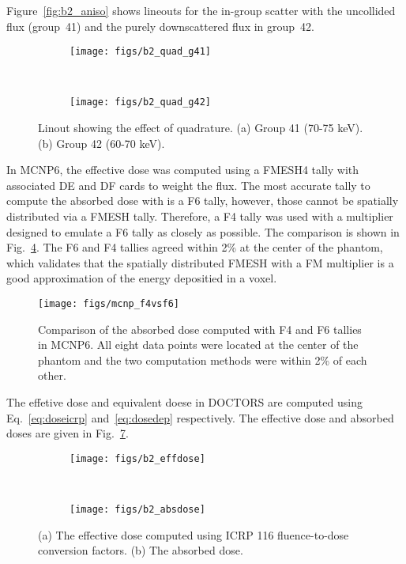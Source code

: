 Figure~\ref{fig:b2_aniso} shows lineouts for the in-group scatter with the uncollided flux (group~41) and the purely downscattered flux in group~42.
\begin{figure}
    \centering
    \begin{subfigure}[b]{0.3\textwidth}
        \texttt{[image: figs/b2\_quad\_g41]}
        \caption{}
        \label{fig:b2_quad_g41}
    \end{subfigure}
    ~ 
    \begin{subfigure}[b]{0.3\textwidth}
        \texttt{[image: figs/b2\_quad\_g42]}
        \caption{}
        \label{fig:b2_quad_g42}
    \end{subfigure}
    \caption{Linout showing the effect of quadrature. (a) Group 41 (70-75 keV). (b) Group 42 (60-70 keV). }\label{fig:b2_quad}
\end{figure}

In MCNP6, the effective dose was computed using a FMESH4 tally with associated DE and DF cards to weight the flux. The most accurate tally to compute the absorbed dose with is a F6 tally, however, those cannot be spatially distributed via a FMESH tally. Therefore, a F4 tally was used with a multiplier designed to emulate a F6 tally as closely as possible. The comparison is shown in Fig.~\ref{fig:mcnp_f4vsf6}. The F6 and F4 tallies agreed within 2\% at the center of the phantom, which validates that the spatially distributed FMESH with a FM multiplier is a good approximation of the energy depositied in a voxel.

\begin{figure}[tb]
  \begin{center}
   \texttt{[image: figs/mcnp\_f4vsf6]}
  \end{center}
  \caption{Comparison of the absorbed dose computed with F4 and F6 tallies in MCNP6. All eight data points were located at the center of the phantom and the two computation methods were within 2\% of each other.}
\label{fig:mcnp_f4vsf6}
\end{figure}

The effetive dose and equivalent doese in DOCTORS are computed using Eq.~\ref{eq:doseicrp} and~\ref{eq:dosedep} respectively. The effective dose and absorbed doses are given in Fig.~\ref{fig:b2_dose}.

\begin{figure}
    \centering
    \begin{subfigure}[b]{0.45\textwidth}
        \texttt{[image: figs/b2\_effdose]}
        \caption{}
        \label{fig:b2_effdose}
    \end{subfigure}
    ~
    \begin{subfigure}[b]{0.45\textwidth}
        \texttt{[image: figs/b2\_absdose]}
        \caption{}
        \label{fig:b2_absdose}
    \end{subfigure}
    \caption{(a) The effective dose computed using ICRP 116 fluence-to-dose conversion factors. (b) The absorbed dose.}\label{fig:b2_dose}
\end{figure}


